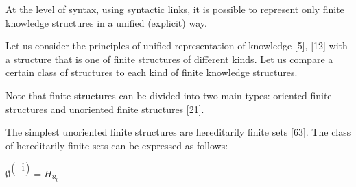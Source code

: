 \begin{multicols}{2}
At the level of syntax, using syntactic links, it is
possible to represent only finite knowledge structures in
a unified (explicit) way.
\par Let us consider the principles of unified representation
of knowledge [5], [12] with a structure that is one of finite
structures of different kinds. Let us compare a certain
class of structures to each kind of finite knowledge
structures.
\par Note that finite structures can be divided into two main
types: oriented finite structures and unoriented finite
structures [21].
\par The simplest unoriented finite structures are hereditarily finite sets [63]. The class of hereditarily finite sets
can be expressed as follows:
\par
\begin{center}
\begin{math}
\emptyset^{(+ \overset{*}{1})} = H_{\aleph_0}
\end{math}
\end{center}
\end{multicols}






